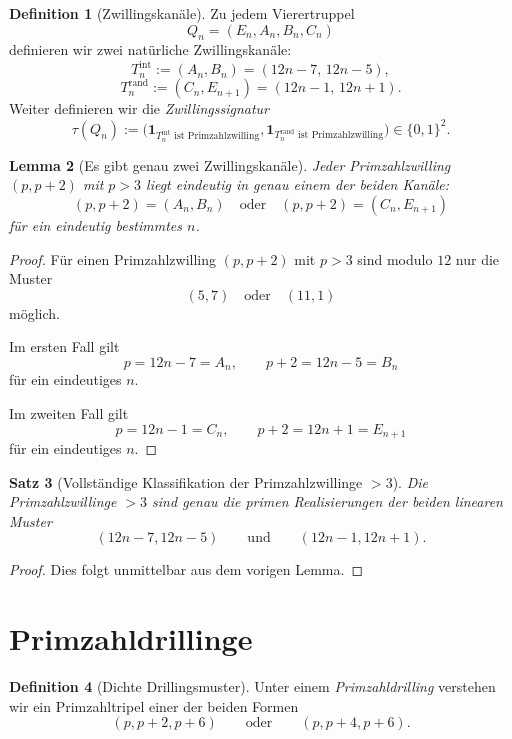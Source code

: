\documentclass[11pt,a4paper]{article}
\newtheorem{satz}{Satz}
\newtheorem{lemma}[satz]{Lemma}
\theoremstyle{definition}
\newtheorem{definition}[satz]{Definition}
\theoremstyle{remark}
\newcommand{\ind}{\mathbf{1}}
\begin{document}
	\begin{definition}[Zwillingskanäle]
		Zu jedem Vierertruppel
		\[
		Q_n=(E_n,A_n,B_n,C_n)
		\]
		definieren wir zwei natürliche Zwillingskanäle:
		\[
		T_n^{\mathrm{int}}:=(A_n,B_n)=(12n-7,\,12n-5),
		\]
		\[
		T_n^{\mathrm{rand}}:=(C_n,E_{n+1})=(12n-1,\,12n+1).
		\]
		Weiter definieren wir die \emph{Zwillingssignatur}
		\[
		\tau(Q_n):=
		\bigl(
		\ind_{T_n^{\mathrm{int}}\text{ ist Primzahlzwilling}},
		\ind_{T_n^{\mathrm{rand}}\text{ ist Primzahlzwilling}}
		\bigr)\in\{0,1\}^2.
		\]
	\end{definition}
	
	\begin{lemma}[Es gibt genau zwei Zwillingskanäle]
		Jeder Primzahlzwilling \((p,p+2)\) mit \(p>3\) liegt eindeutig in genau einem der beiden Kanäle:
		\[
		(p,p+2)=(A_n,B_n)
		\quad\text{oder}\quad
		(p,p+2)=(C_n,E_{n+1})
		\]
		für ein eindeutig bestimmtes \(n\).
	\end{lemma}
	
	\begin{proof}
		Für einen Primzahlzwilling \((p,p+2)\) mit \(p>3\) sind modulo \(12\) nur die Muster
		\[
		(5,7)\quad\text{oder}\quad(11,1)
		\]
		möglich.
		
		Im ersten Fall gilt
		\[
		p=12n-7=A_n,\qquad p+2=12n-5=B_n
		\]
		für ein eindeutiges \(n\).
		
		Im zweiten Fall gilt
		\[
		p=12n-1=C_n,\qquad p+2=12n+1=E_{n+1}
		\]
		für ein eindeutiges \(n\).
	\end{proof}
	
	\begin{satz}[Vollständige Klassifikation der Primzahlzwillinge \(>3\)]
		Die Primzahlzwillinge \(>3\) sind genau die primen Realisierungen der beiden linearen Muster
		\[
		(12n-7,12n-5)
		\qquad\text{und}\qquad
		(12n-1,12n+1).
		\]
	\end{satz}
	
	\begin{proof}
		Dies folgt unmittelbar aus dem vorigen Lemma.
	\end{proof}
	
	\section{Primzahldrillinge}
	
	\begin{definition}[Dichte Drillingsmuster]
		Unter einem \emph{Primzahldrilling} verstehen wir ein Primzahltripel einer der beiden Formen
		\[
		(p,p+2,p+6)
		\qquad\text{oder}\qquad
		(p,p+4,p+6).
		\]
	\end{definition}
	
\end{document}
